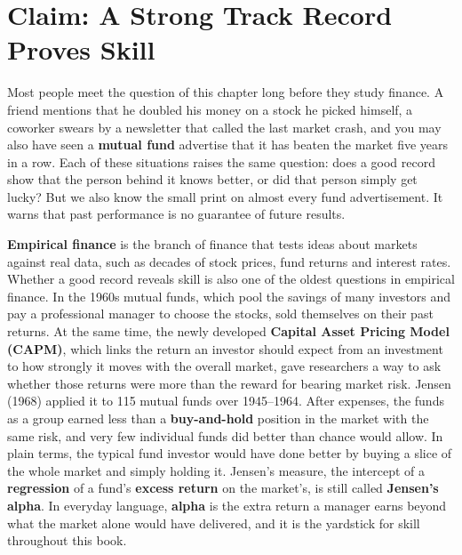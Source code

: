 \makeatletter
{}
\makeatother

\chapter{Claim: A Strong Track Record Proves Skill}
\label{ch:01}

Most people meet the question of this chapter long before they study finance. A friend mentions that he doubled his money on a stock he picked himself, a coworker swears by a newsletter that called the last market crash, and you may also have seen a \textbf{mutual fund} advertise that it has beaten the market five years in a row.
Each of these situations raises the same question: does a good record show that the person behind it knows better, or did that person simply get lucky? But we also know the small print on almost every fund advertisement. It warns that past performance is no guarantee of future results.

\textbf{Empirical finance} is the branch of finance that tests ideas about markets against real data, such as decades of stock prices, fund returns and interest rates.
Whether a good record reveals skill is also one of the oldest questions in empirical finance. In the 1960s mutual funds, which pool the savings of many investors and pay a professional manager to choose the stocks, sold themselves on their past returns. At the same time, the newly developed \textbf{Capital Asset Pricing Model (CAPM)}, which links the return an investor should expect from an investment to how strongly it moves with the overall market, gave researchers a way to ask whether those returns were more than the reward for bearing market risk. Jensen (1968) applied it to 115 mutual funds over 1945--1964. After expenses, the funds as a group earned less than a \textbf{buy-and-hold} position in the market with the same risk, and very few individual funds did better than chance would allow. In plain terms, the typical fund investor would have done better by buying a slice of the whole market and simply holding it. Jensen's measure, the intercept of a \textbf{regression} of a fund's \textbf{excess return} on the market's, is still called \textbf{Jensen's alpha}. In everyday language, \textbf{alpha} is the extra return a manager earns beyond what the market alone would have delivered, and it is the yardstick for skill throughout this book.


